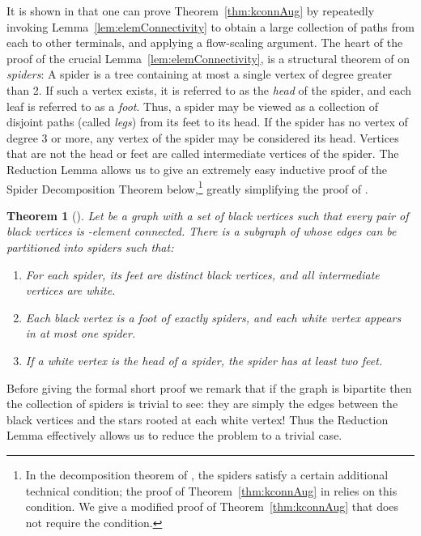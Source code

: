 \documentclass[11pt]{article}
\newtheorem{theorem}[lemma]{Theorem}
\begin{document}
It is shown in \cite{ChuzhoyK08} that one can prove
Theorem~\ref{thm:kconnAug} by repeatedly invoking
Lemma~\ref{lem:elemConnectivity} to obtain a large collection of paths
from each  to other terminals, and applying a flow-scaling
argument. The heart of the proof of the crucial
Lemma~\ref{lem:elemConnectivity}, is a structural theorem of
\cite{ChuzhoyK08} on \emph{spiders}: A spider is a tree containing at
most a single vertex of degree greater than 2. If such a vertex
exists, it is referred to as the \emph{head} of the spider, and each
leaf is referred to as a \emph{foot}.  Thus, a spider may be viewed as
a collection of disjoint paths (called \emph{legs}) from its feet to
its head. If the spider has no vertex of degree 3 or more, any vertex
of the spider may be considered its head.  Vertices that are not the
head or feet are called intermediate vertices of the spider. The
Reduction Lemma allows us to give an extremely easy inductive proof of
the Spider Decomposition Theorem below,\footnote{In the decomposition
  theorem of \cite{ChuzhoyK08}, the spiders satisfy a certain
  additional technical condition; the proof of
  Theorem~\ref{thm:kconnAug} in \cite{ChuzhoyK08} relies on this
  condition. We give a modified proof of Theorem~\ref{thm:kconnAug}
  that does not require the condition.}
greatly simplifying the proof of \cite{ChuzhoyK08}.

\begin{theorem}[\cite{ChuzhoyK08}]\label{thm:spiders}
  Let  be a graph with a set  of black
  vertices such that every pair of black vertices is -element
  connected. There is a subgraph  of  whose edges can be
  partitioned into spiders such that:
  \vspace{-0.1in}
  \begin{enumerate}
    \item For each spider, its feet are distinct black vertices, and
      all intermediate vertices are white.

    \item Each black vertex is a foot of exactly  spiders, and each
      white vertex appears in at most one spider. 

    \item If a white vertex is the head of a spider, the spider has at
      least two feet.
  \end{enumerate}
\end{theorem}

Before giving the formal short proof we remark that if the graph is
bipartite then the collection of spiders is trivial to see: they are
simply the edges between the black vertices and the stars rooted at
each white vertex! Thus the Reduction Lemma effectively
allows us to reduce the problem to a trivial case. ~\\
\end{document}
